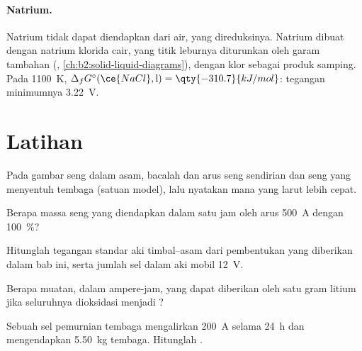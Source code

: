 \paragraph{Natrium.} Natrium tidak dapat diendapkan dari air, yang
direduksinya. Natrium dibuat dengan  natrium klorida cair, yang
titik leburnya diturunkan oleh garam tambahan (,
\cref{ch:b2:solid-liquid-diagrams}), dengan klor sebagai produk samping.
Pada \qty{1100}{K}, $\Delta_f G^\circ(\ce{NaCl}, \text{l}) =
\qty{-310.7}{kJ/mol}$: tegangan minimumnya \qty{3.22}{V}.

\section{Latihan}

\begin{exercise}[$\star$]\label{exo:b2:batteries-electrolysis:1}
Pada gambar seng dalam asam, bacalah  dan arus seng
sendirian dan seng yang menyentuh tembaga (satuan model), lalu nyatakan
mana yang larut lebih cepat.
\end{exercise}

\begin{exercise}[$\star$]\label{exo:b2:batteries-electrolysis:2}
Berapa massa seng yang diendapkan dalam satu jam oleh arus \qty{500}{A}
dengan  100~\%?
\end{exercise}

\begin{exercise}[$\star$]\label{exo:b2:batteries-electrolysis:3}
Hitunglah tegangan standar aki timbal--asam dari  pembentukan
yang diberikan dalam bab ini, serta jumlah sel dalam aki mobil
\qty{12}{V}.
\end{exercise}

\begin{exercise}[$\star$]\label{exo:b2:batteries-electrolysis:4}
Berapa muatan, dalam ampere-jam, yang dapat diberikan oleh satu gram
litium jika seluruhnya dioksidasi menjadi ?
\end{exercise}

\begin{exercise}[$\star\star$]\label{exo:b2:batteries-electrolysis:5}
Sebuah sel pemurnian tembaga mengalirkan \qty{200}{A} selama \qty{24}{h}
dan mengendapkan \qty{5.50}{kg} tembaga. Hitunglah .
\end{exercise}

